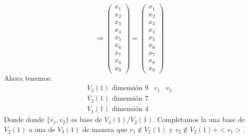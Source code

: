 \documentclass{article}
\begin{document}
$$
\Rightarrow
\left(\begin{array}{c}
    x_1 \\
    x_2 \\
    x_3 \\
    x_4 \\
    x_5 \\
    x_6 \\
    x_7 \\
    x_8 \\
    x_9
\end{array}\right)
=
\left(\begin{array}{c}
    x_1 \\
    x_2 \\
    x_3 \\
    x_4 \\
    x_5 \\
    x_6 \\
    x_7 \\
    x_8 \\
    x_9
\end{array}\right)
$$
Ahora tenemos:
$$
\begin{array}{c|cc}
    V_3(1) \text{ dimensión }9 & v_1 & v_2\\
    V_2(1) \text{ dimensión }7 \\
    V_1(1) \text{ dimensión }4
\end{array}
$$
Donde donde $\{\overline{v_1},\overline{v_2}\}$ es base de $V_3(1)/V_2(1)$. Completamos la una base de $V_2(1)$ a una de $V_3(1)$ de manera que $v_1\notin V_2(1)$ y $v_2 \notin V_2(1)+<v_1>$.
\end{document}
